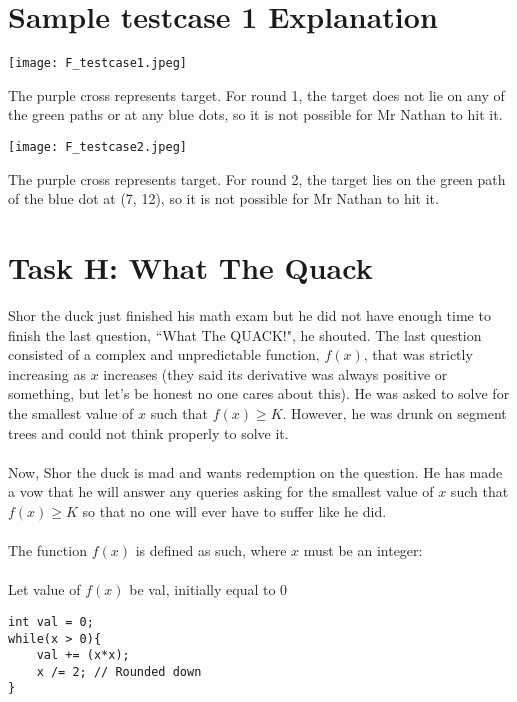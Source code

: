 \documentclass{report}
\begin{document}
\section*{Sample testcase 1 Explanation}
\begin{center}
    \texttt{[image: F\_testcase1.jpeg]}
\end{center}
\hfill \break
The purple cross represents target. For round 1, the target does not lie on any of the green paths or at any blue dots, so it is not possible for Mr Nathan to hit it.

\pagebreak

\hfill \break \hfill \break

\begin{center}
    \texttt{[image: F\_testcase2.jpeg]}
\end{center}
\hfill \break
The purple cross represents target. For round 2, the target lies on the green path of the blue dot at (7, 12), so it is not possible for Mr Nathan to hit it.

\pagebreak
\hfill \break \hfill \break

\section*{Task H: What The Quack}
Shor the duck just finished his math exam but he did not have enough time to finish the last question, ``What The QUACK!", he shouted. The last question consisted of a complex and unpredictable function, $f(x)$, that was strictly increasing as $x$ increases (they said its derivative was always positive or something, but let's be honest no one cares about this). He was asked to solve for the smallest value of $x$ such that $f(x) \geq K$. However, he was drunk on segment trees and could not think properly to solve it.
\\\\
Now, Shor the duck is mad and wants redemption on the question. He has made a vow that he will answer any queries asking for the smallest value of $x$ such that $f(x) \geq K$ so that no one will ever have to suffer like he did.
\\\\
The function $f(x)$ is defined as such, where $x$ must be an integer:
\\\\
Let value of $f(x)$ be val, initially equal to 0

\begin{verbatim}
int val = 0;
while(x > 0){
    val += (x*x);
    x /= 2; // Rounded down
}
\end{verbatim}
\end{document}
